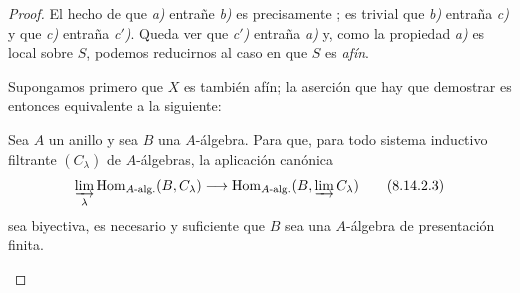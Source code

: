\begin{proof}
El hecho de que \emph{a)} entrañe \emph{b)} es precisamente ; es trivial que \emph{b)} entraña \emph{c)} y que \emph{c)} entraña \emph{c$'$)}.
Queda ver que \emph{c$'$)} entraña \emph{a)} y, como la propiedad \emph{a)} es local sobre $S$, podemos reducirnos al caso en que $S$ es \emph{afín}.

Supongamos primero que $X$ es también afín; la aserción que hay que demostrar es entonces equivalente a la siguiente:

\begin{corollary}[8.14.2.2]
\label{IV.8.14.2.2}
Sea $A$ un anillo y sea $B$ una $A$-álgebra.
Para que, para todo sistema inductivo filtrante $(C_\lambda)$ de $A$-álgebras, la aplicación canónica
\begin{equation}
\label{IV.8.14.2.3}
\varinjlim_\lambda\operatorname{Hom}_{A\text{-}\mathrm{alg.}}(B,C_\lambda)\to\operatorname{Hom}_{A\text{-}\mathrm{alg.}}(B,\varinjlim C_\lambda) \tag{8.14.2.3}
\end{equation}
sea biyectiva, es necesario y suficiente que $B$ sea una $A$-álgebra de presentación finita.
\end{corollary}


\end{proof}
